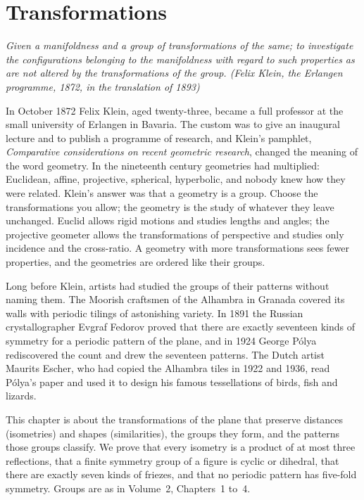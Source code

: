 \chapter{Transformations}\label{geometry:ch:transformations}

\begin{center}\itshape
Given a manifoldness and a group of transformations of the same; to investigate the configurations belonging to the
manifoldness with regard to such properties as are not altered by the transformations of the group.
\upshape(Felix Klein, the Erlangen programme, 1872, in the translation of 1893)
\end{center}

In October 1872 Felix Klein, aged twenty-three, became a full professor at the small university of Erlangen in Bavaria. The custom
was to give an inaugural lecture and to publish a programme of research, and Klein's pamphlet, \emph{Comparative considerations on recent
geometric research}, changed the meaning of the word geometry. In the nineteenth century geometries had multiplied: Euclidean,
affine, projective, spherical, hyperbolic, and nobody knew how they were related. Klein's answer was that a geometry is a group. Choose
the transformations you allow; the geometry is the study of whatever they leave unchanged. Euclid allows rigid motions and studies
lengths and angles; the projective geometer allows the transformations of perspective and studies only incidence and the cross-ratio.
A geometry with more transformations sees fewer properties, and the geometries are ordered like their groups.

Long before Klein, artists had studied the groups of their patterns without naming them. The Moorish craftsmen of the Alhambra in
Granada covered its walls with periodic tilings of astonishing variety. In 1891 the Russian crystallographer Evgraf Fedorov proved that
there are exactly seventeen kinds of symmetry for a periodic pattern of the plane, and in 1924 George P\'olya rediscovered the count
and drew the seventeen patterns. The Dutch artist Maurits Escher, who had copied the Alhambra tiles in 1922 and 1936, read P\'olya's
paper and used it to design his famous tessellations of birds, fish and lizards.

This chapter is about the transformations of the plane that preserve distances (isometries) and shapes (similarities), the groups
they form, and the patterns those groups classify. We prove that every isometry is a product of at most three reflections, that a
finite symmetry group of a figure is cyclic or dihedral, that there are exactly seven kinds of friezes, and that no periodic pattern
has five-fold symmetry. Groups are as in Volume~2, Chapters~1 to~4.

